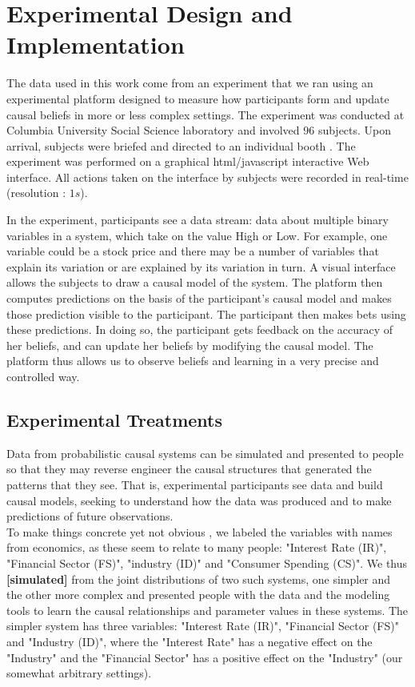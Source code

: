 \section{Experimental Design and Implementation}
\label{SI_experiment}

The data used in this work come from an experiment that we ran using an experimental platform 
designed to measure how participants form and update causal beliefs in more or less complex 
settings.  The experiment was conducted at Columbia University Social Science laboratory and 
involved 96 subjects.  Upon arrival, subjects were briefed and directed to an individual booth . 
The experiment was performed on a graphical  html/javascript interactive Web interface. All 
actions taken on the interface by subjects were recorded in real-time (resolution : $1s$). 

In the experiment, participants see a data stream: data about multiple binary variables in a 
system, which take on the value High or Low. For example, one variable could be a stock price 
and there may be a number of variables that explain its variation or are explained by its variation 
in turn.  A visual interface allows the subjects to draw a causal model of the system. The platform 
then computes predictions on the basis of the participant's causal model and makes those 
prediction visible to the participant. The participant then makes bets using these predictions. In 
doing so, the participant gets feedback on the accuracy of her beliefs, and can update her beliefs 
by modifying the causal model. The platform thus allows us to observe beliefs and learning in a 
very precise and controlled way.

\subsection{Experimental Treatments}
Data from probabilistic causal systems can be simulated and presented to people so that they may reverse engineer the causal 
structures that generated the patterns that they see. That is, experimental participants see data and build causal models, seeking to 
understand how the data was produced and to make predictions of future observations. \\

To make things concrete yet not obvious , we labeled the variables with names from economics, as these seem to relate to many 
people: "Interest Rate (IR)", "Financial Sector (FS)", "industry (ID)" and "Consumer Spending (CS)". We thus {\bf [simulated]} from the joint distributions of two such systems, one simpler and the other more complex and presented  people with the data and the modeling tools to learn the causal relationships and parameter values in these systems. The simpler system has three variables: "Interest Rate (IR)", "Financial Sector (FS)" and "Industry (ID)", where the "Interest Rate" has a negative effect on the "Industry" and the "Financial Sector" has a positive effect on the "Industry" (our somewhat arbitrary settings).\\

